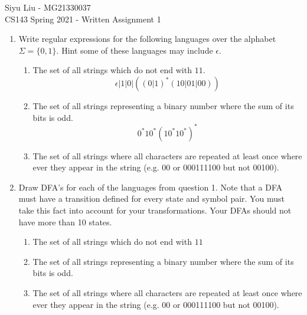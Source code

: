 \documentclass[11pt]{article}
\begin{document}
\begin{center}
\LARGE Siyu Liu - MG21330037 \\
\LARGE CS143 Spring 2021 - Written Assignment 1 \\
\end{center}

\begin{enumerate}
\item Write regular expressions for the following languages over the alphabet $\Sigma = \{0, 1\}$.  Hint some of these languages may include $\epsilon$.
\begin{enumerate}
    \item The set of all strings which do not end with $11$.
    \[
        \epsilon|1|0|((0|1)^*(10|01|00))
    \]
    \item The set of all strings representing a binary number where the sum of its bits is odd.
    \[
        0^*10^*(10^*10^*)^*
    \]
    \item The set of all strings where all characters are repeated at least once where ever they appear in the string (e.g. 00 or 000111100 but not 00100).
    \[
    \]
\end{enumerate}

\newpage

\item Draw DFA's for each of the languages from question 1. Note that a DFA must have a transition defined for every state and symbol pair. You must take this fact into account for your transformations. Your DFAs should not have more than 10 states.

\begin{enumerate}
    \item The set of all strings which do not end with $11$ \\
    \item The set of all strings representing a binary number where the sum of its bits is odd. \\
    \item The set of all strings where all characters are repeated at least once where ever they appear in the string (e.g. 00 or 000111100 but not 00100). \\
\end{enumerate}


\end{enumerate}
\end{document}
